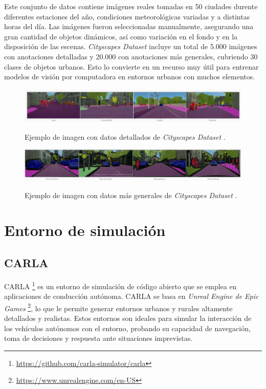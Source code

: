 Este conjunto de datos contiene imágenes reales tomadas en 50 ciudades durente diferentes estaciones del año, condiciones meteorológicas variadas y a distintas horas del día. Las imágenes fueron seleccionadas manualmente, asegurando una gran cantidad de objetos dinámicos, así como variación en el fondo y en la disposición de las escenas. \textit{Cityscapes Dataset} incluye un total de 5.000 imágenes con anotaciones detalladas y 20.000 con anotaciones más generales, cubriendo 30 clases de objetos urbanos. Esto lo convierte en un recurso muy útil para entrenar modelos de visión por computadora en entornos urbanos con muchos elementos.
\begin{figure}[ht]
\begin{center}
\includegraphics[width=15cm]{figs/Plataformas_Desarollo/detallado-ef.png}
\caption{Ejemplo de imagen con datos detallados de \textit{Cityscapes Dataset} \cite{cityscapes}.}
\label{foto_ef_detallado}
\vspace{0.5cm} %
\includegraphics[width=15cm]{figs/Plataformas_Desarollo/no_detallado_ef.png}
\caption{Ejemplo de imagen con datos más generales de \textit{Cityscapes Dataset} \cite{cityscapes}.}
\label{foto_ef_general}
\end{center}
\end{figure}

\section{Entorno de simulación}
\label{sec:sim}
\subsection{CARLA}
\label{sec:carla}

CARLA \footnote{\url{https://github.com/carla-simulator/carla}} es un entorno de simulación de código abierto que se emplea en aplicaciones de conducción autónoma. CARLA se basa en \textit{Unreal Engine de Epic Games} \footnote{\url{https://www.unrealengine.com/en-US}}, lo que le permite generar entornos urbanos y rurales altamente detallados y realistas. Estos entornos son ideales para simular la interacción de los vehículos autónomos con el entorno, probando su capacidad de navegación, toma de decisiones y respuesta ante situaciones imprevistas.

